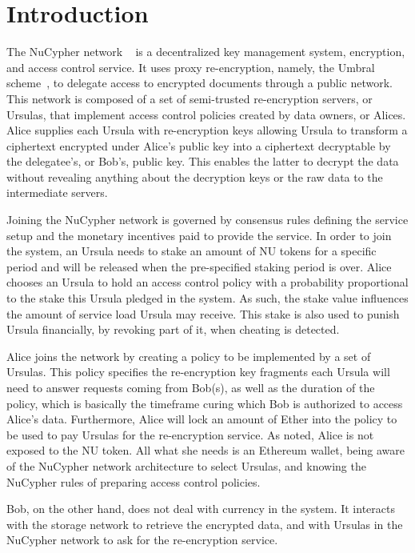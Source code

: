 \section{Introduction}
\label{intro}
The NuCypher network ~\cite{egorov2017nucypher} is a decentralized key management 
system, encryption, and access control service. It uses proxy re-encryption, namely, the 
Umbral  scheme~\cite{umbral2018}, to delegate access to encrypted 
documents through a public network. This network is composed of a set of semi-trusted 
re-encryption servers, or Ursulas, that implement access control policies created by data 
owners, or Alices. Alice supplies each Ursula with re-encryption keys allowing Ursula to transform 
a ciphertext encrypted under Alice's public key into a ciphertext decryptable by the delegatee's, or Bob's,  
public key. This enables the latter to decrypt the data without revealing anything about the 
decryption keys or the raw data to the intermediate servers.


Joining the NuCypher network is governed by consensus rules defining the service setup 
and the monetary incentives paid to provide the service. In order to join the 
system, an Ursula needs to stake an amount of NU tokens for a specific period 
and will be released when the pre-specified staking period is over. Alice chooses an  
Ursula to hold an access control policy with a probability proportional to the stake this Ursula 
pledged in the system. As such, the stake value influences the amount of service load Ursula 
may receive. This stake is also used to punish Ursula financially, by revoking part 
of it, when cheating is detected. 


Alice joins the network by creating a policy to be implemented by a 
set of Ursulas. This policy specifies the re-encryption key fragments each Ursula will
need to answer requests coming from Bob(s), as well as the duration of the policy, which 
is basically the timeframe curing which Bob is authorized to access Alice's data.  Furthermore, 
Alice will lock an amount of Ether into the policy to be used to pay Ursulas for the re-encryption 
service. As noted, Alice is not exposed to the NU token. All what she needs is an Ethereum 
wallet, being aware of the NuCypher network architecture to select Ursulas, and knowing the 
NuCypher rules of preparing access control policies.


Bob, on the other hand, does not deal with currency in the system. It interacts with the storage 
network to retrieve the encrypted data, and with Ursulas in the NuCypher network to ask for the  
re-encryption service.


